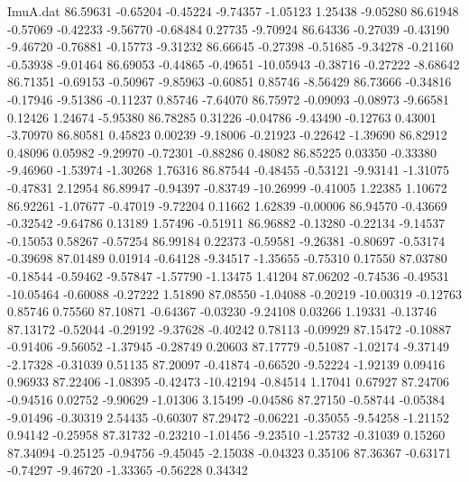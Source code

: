 \begin{filecontents}{ImuA.dat}
  86.59631   -0.65204   -0.45224   -9.74357   -1.05123    1.25438   -9.05280
  86.61948   -0.57069   -0.42233   -9.56770   -0.68484    0.27735   -9.70924
  86.64336   -0.27039   -0.43190   -9.46720   -0.76881   -0.15773   -9.31232
  86.66645   -0.27398   -0.51685   -9.34278   -0.21160   -0.53938   -9.01464
  86.69053   -0.44865   -0.49651  -10.05943   -0.38716   -0.27222   -8.68642
  86.71351   -0.69153   -0.50967   -9.85963   -0.60851    0.85746   -8.56429
  86.73666   -0.34816   -0.17946   -9.51386   -0.11237    0.85746   -7.64070
  86.75972   -0.09093   -0.08973   -9.66581    0.12426    1.24674   -5.95380
  86.78285    0.31226   -0.04786   -9.43490   -0.12763    0.43001   -3.70970
  86.80581    0.45823    0.00239   -9.18006   -0.21923   -0.22642   -1.39690
  86.82912    0.48096    0.05982   -9.29970   -0.72301   -0.88286    0.48082
  86.85225    0.03350   -0.33380   -9.46960   -1.53974   -1.30268    1.76316
  86.87544   -0.48455   -0.53121   -9.93141   -1.31075   -0.47831    2.12954
  86.89947   -0.94397   -0.83749  -10.26999   -0.41005    1.22385    1.10672
  86.92261   -1.07677   -0.47019   -9.72204    0.11662    1.62839   -0.00006
  86.94570   -0.43669   -0.32542   -9.64786    0.13189    1.57496   -0.51911
  86.96882   -0.13280   -0.22134   -9.14537   -0.15053    0.58267   -0.57254
  86.99184    0.22373   -0.59581   -9.26381   -0.80697   -0.53174   -0.39698
  87.01489    0.01914   -0.64128   -9.34517   -1.35655   -0.75310    0.17550
  87.03780   -0.18544   -0.59462   -9.57847   -1.57790   -1.13475    1.41204
  87.06202   -0.74536   -0.49531  -10.05464   -0.60088   -0.27222    1.51890
  87.08550   -1.04088   -0.20219  -10.00319   -0.12763    0.85746    0.75560
  87.10871   -0.64367   -0.03230   -9.24108    0.03266    1.19331   -0.13746
  87.13172   -0.52044   -0.29192   -9.37628   -0.40242    0.78113   -0.09929
  87.15472   -0.10887   -0.91406   -9.56052   -1.37945   -0.28749    0.20603
  87.17779   -0.51087   -1.02174   -9.37149   -2.17328   -0.31039    0.51135
  87.20097   -0.41874   -0.66520   -9.52224   -1.92139    0.09416    0.96933
  87.22406   -1.08395   -0.42473  -10.42194   -0.84514    1.17041    0.67927
  87.24706   -0.94516    0.02752   -9.90629   -1.01306    3.15499   -0.04586
  87.27150   -0.58744   -0.05384   -9.01496   -0.30319    2.54435   -0.60307
  87.29472   -0.06221   -0.35055   -9.54258   -1.21152    0.94142   -0.25958
  87.31732   -0.23210   -1.01456   -9.23510   -1.25732   -0.31039    0.15260
  87.34094   -0.25125   -0.94756   -9.45045   -2.15038   -0.04323    0.35106
  87.36367   -0.63171   -0.74297   -9.46720   -1.33365   -0.56228    0.34342

\end{filecontents}
